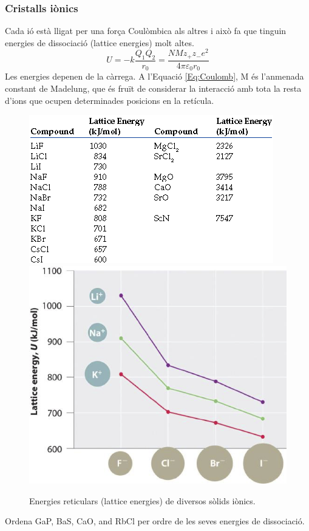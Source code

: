 \subsubsection{Cristalls iònics}
 Cada ió està lligat per una força Coulòmbica als altres i això fa que tinguin energies de dissociació (lattice energies) molt altes. 
\begin{equation}
U=-k\frac{Q_1 Q_2}{r_0} = \frac{NMz_+z_-e^2}{4\pi \varepsilon_0 r_0}
\label{Eq:Coulomb}
\end{equation}
Les energies depenen de la càrrega.
A l'Equació \ref{Eq:Coulomb}, M és l'anmenada constant de Madelung, que és fruït de considerar la interacció amb tota la resta d'ions que ocupen determinades posicions en la retícula.
\begin{figure}[h]
\centering
\includegraphics[scale=0.8]{figures/latticeEnergy.png}
\includegraphics[scale=0.6]{figures/latticeEnergySize.png}
\caption{Energies reticulars (lattice energies) de diversos sòlids iònics.}
\label{fig:latticeEnergy}
\end{figure}
\begin{exr}
Ordena GaP, BaS, CaO, and RbCl per ordre de les seves energies de dissociació.
\end{exr}

